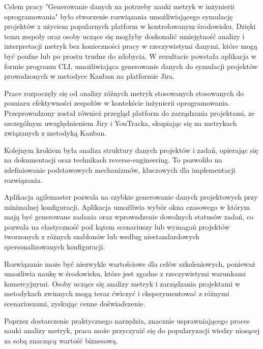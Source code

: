 Celem pracy "Generowanie danych na potrzeby nauki metryk w inżynierii oprogramowania" było stworzenie rozwiązania umożliwiającego symulację projektów z użyciem popularnych platform w kontrolowanym środowisku. Dzięki temu
zespoły oraz osoby uczące się mogłyby doskonalić umiejętność analizy i interpretacji metryk bez konieczności pracy w rzeczywistymi danymi, które mogą być poufne lub po prostu trudne do zdobycia. W rezultacie powstała aplikacja
w formie programu CLI, umożliwiająca generowanie danych do symulacji projektów prowadzonych w metodyce Kanban na platformie Jira.

Prace rozpoczęły się od analizy różnych metryk stosowanych stosowanych do pomiaru efektywności zespołów w kontekście inżynierii oprogramowania. Przeprowadzony został również przegląd platform do zarządzania projektami, ze szczególnym
uwzględnieniem Jiry i YouTracka, skupiając się na metrykach związanych z metodyką Kanban.

Kolejnym krokiem była analiza struktury danych projektów i zadań, opierając się na dokumentacji oraz technikach reverse-engineering. To pozwoliło na zdefiniowanie podstawowych mechanizmów, kluczowych dla implementacji rozwiązania.

Aplikacja agilemaster pozwala na szybkie generowanie danych projektowych przy minimalnej konfiguracji. Aplikacja umożliwia wybór okna czasowego w którym mają być generowane zadania oraz wprowadzenie dowolnych statusów zadań, co pozwala
na elastyczność pod kątem scenariuszy lub wymagań projektów tworzonych z różnych szablonów lub według niestandardowych spersonalizowanych konfiguracji.

Rozwiązanie może być niezwykle wartościowe dla celów szkoleniowych, ponieważ umożliwia naukę w środowisku, które jest zgodne z rzeczywistymi warunkami komercyjnymi. Osoby uczące się analizy metryk i zarządzania projektami w metodykach
zwinnych mogą teraz ćwiczyć i eksperymentować z różnymi scenariuszami, zyskując cenne doświadczenie.

Poprzez dostarczenie praktycznego narzędzia, znacznie usprawniającego proces nauki analizy metryk, praca może przyczynić się do popularyzacji wiedzy niosącej za sobą znaczącą wartość biznesową.
